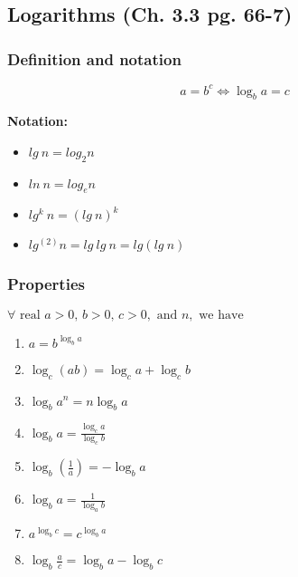 \subsection{Logarithms (Ch. 3.3 pg. 66-7)}
    \subsubsection{Definition and notation}
        \begin{definition}
            \begin{equation}
                a = b^c \iff \log_b a = c
            \end{equation}

            \textbf{Notation:}
            \begin{itemize}
                \item $lg \: n = log_2 n$
                \item $ln \: n = log_e n$
                \item $lg^k \: n = (lg \: n)^k$
                \item $lg^{(2)} n = lg \: lg \: n = lg(lg \: n)$
            \end{itemize}
        \end{definition}

    \subsubsection{Properties}
        \begin{definition}
            $\forall \text{ real } a>0 \text{, } b>0 \text{, } c>0, \text{ and } n, \text{ we have}$
            \begin{enumerate}
                \item \( a = b^{\log_b a} \)
                \item \( \log_c(ab) = \log_c a + \log_c b \)
                \item \( \log_b a^n = n \log_b a \)
                \item \( \log_b a = \frac{\log_c a}{\log_c b} \)
                \item \( \log_b \left(\frac{1}{a}\right) = -\log_b a \)
                \item \( \log_b a = \frac{1}{\log_a b} \)
                \item \( a^{\log_b c} = c^{\log_b a} \)
                \item \( \log_b \frac{a}{c} = \log_b a - \log_b c\)
            \end{enumerate}
        \end{definition}

